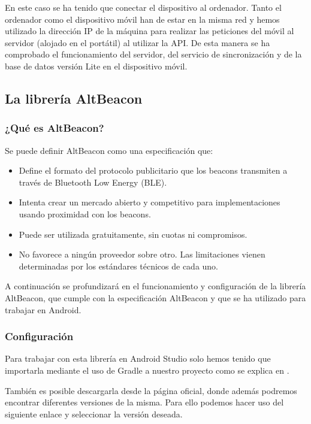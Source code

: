 En este caso se ha tenido que conectar el dispositivo al ordenador. Tanto el ordenador como el dispositivo móvil han de estar en la misma red y hemos utilizado la dirección IP de la máquina para realizar las peticiones del móvil al servidor (alojado en el portátil) al utilizar la API. De esta manera se ha comprobado el funcionamiento del servidor, del servicio de sincronización y de la base de datos versión Lite en el dispositivo móvil.


\subsection{La librería AltBeacon}


\subsubsection{¿Qué es AltBeacon?}

Se puede definir AltBeacon como una especificación que: 

\begin{itemize}
\item Define el formato del protocolo publicitario que los beacons transmiten a través de Bluetooth Low Energy (BLE).
\item Intenta crear un mercado abierto y competitivo para implementaciones usando proximidad con los beacons.
\item Puede ser utilizada gratuitamente, sin cuotas ni compromisos.
\item No favorece a ningún proveedor sobre otro. Las limitaciones vienen determinadas por los estándares técnicos de cada uno.
\end{itemize}

A continuación se profundizará en el funcionamiento y configuración de la librería AltBeacon, que cumple con la especificación AltBeacon y que se ha utilizado para trabajar en Android.

\subsubsection{Configuración}

Para trabajar con esta librería en Android Studio solo hemos tenido que importarla mediante el uso de Gradle a nuestro proyecto como se explica en \cite{URL::importGradle}.


También es posible descargarla desde la página oficial, donde además podremos encontrar diferentes versiones de la misma. Para ello podemos hacer uso del siguiente enlace \cite{URL::versionAltBeacon} y seleccionar la versión deseada.


